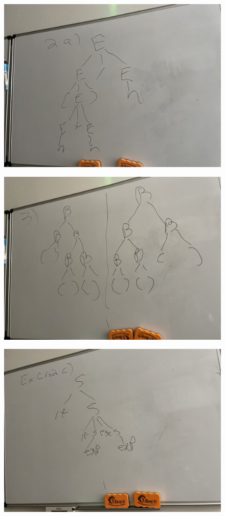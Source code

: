 \documentclass[12pt]{article}
\begin{document}
\begin{enumerate}
    \begin{figure}
        \centering
                \includegraphics[totalheight=8cm]{2-a}
    \end{figure}
    \begin{figure}
        \centering
                \includegraphics[totalheight=8cm]{3}
    \end{figure}
    \begin{figure}
            \centering
                    \includegraphics[totalheight=8cm]{ExCr-c}

\end{figure}
\end{enumerate}
\end{document}
